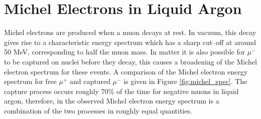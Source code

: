 \section{Michel Electrons in Liquid Argon} \label{ME_LAr}
Michel electrons are produced when a muon decays at rest. In vacuum, this 
decay gives rise to a characteristic energy spectrum which has a sharp 
cut--off at around 50 MeV, corresponding to half the muon mass. In matter it 
is also possible for $\mu^-$ to be captured on nuclei before they decay, this 
causes a broadening of the Michel electron spectrum for these events. A 
comparison of the Michel electron energy spectrum for free $\mu^+$ and 
captured $\mu^-$ is given in Figure \ref{fig:michel_spec}. The capture process 
occurs roughly 70\% of the time for negative muons in liquid argon, therefore, 
in \protodune{} the observed Michel electron energy spectrum is a combination 
of the two processes in roughly equal quantities.
